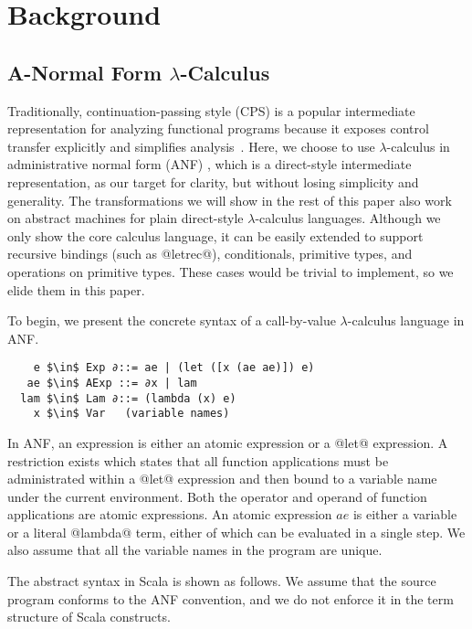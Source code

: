 \documentclass[acmsmall]{acmart}\settopmatter{}
\begin{document}
\section{Background} \label{background}

\subsection{A-Normal Form $\lambda$-Calculus} \label{anfsyntax}

Traditionally, continuation-passing style (CPS) is a popular intermediate representation
for analyzing functional programs because it exposes control transfer explicitly
and simplifies analysis~\cite{Shivers:1991:SSC:115865.115884, Shivers:1988:CFA:53990.54007}.
Here, we choose to use $\lambda$-calculus in administrative normal form (ANF) \cite{flanagan1993essence},
which is a direct-style intermediate representation, as our target for clarity,
but without losing simplicity and generality.
The transformations we will show in the rest of this paper
also work on abstract machines for plain direct-style $\lambda$-calculus languages.
Although we only show the core calculus language, it can be easily extended
to support recursive bindings (such as @letrec@), conditionals, primitive types, and
operations on primitive types. These cases would be trivial to implement,
so we elide them in this paper.

To begin, we present the concrete syntax of a call-by-value $\lambda$-calculus language
in ANF.

\begin{lstlisting}
    e $\in$ Exp ∂::= ae | (let ([x (ae ae)]) e)
   ae $\in$ AExp ::= ∂x | lam
  lam $\in$ Lam ∂::= (lambda (x) e)
    x $\in$ Var   (variable names)
\end{lstlisting}

In ANF, an expression is either an atomic expression or a @let@ expression.
A restriction exists which states that all function applications must be administrated
within a @let@ expression and then bound to a variable name under the current environment.
Both the operator and operand of function applications are atomic expressions.
An atomic expression $ae$ is either a variable or a literal @lambda@ term, either of which
can be evaluated in a single step.
We also assume that all the variable names in the program are unique.

The abstract syntax in Scala is shown as follows. We assume that the source
program conforms to the ANF convention, and we do not enforce it in the term structure
of Scala constructs.
\end{document}
